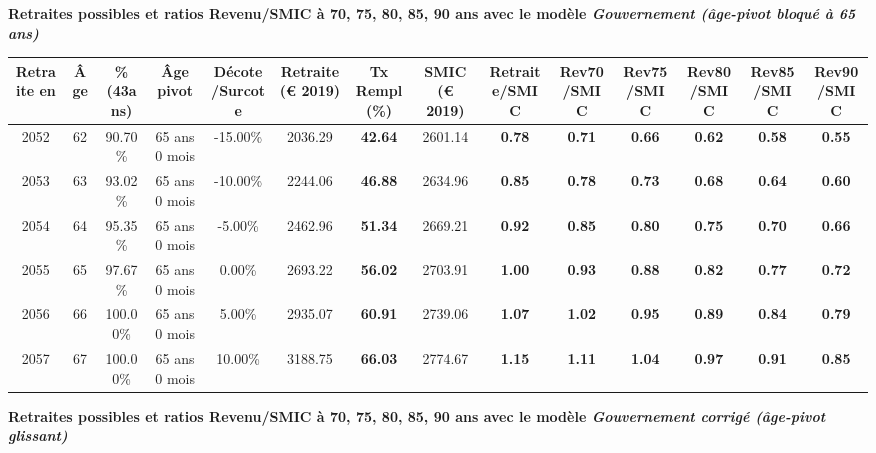 {\bf \noindent Retraites possibles et ratios Revenu/SMIC à 70, 75, 80, 85, 90 ans avec le modèle \emph{Gouvernement (âge-pivot bloqué à 65 ans)}}  
 
\begin{adjustbox}{max width=\textwidth} 
\begin{tabular}[htb]{|c|c||c|c|c||c|c||c||c|c|c|c|c|c|} 
\hline 
 Retraite en &  Âge &  \%(43ans) &  Âge pivot &  Décote/Surcote &  Retraite (\euro{} 2019) &  Tx Rempl(\%) &  SMIC (\euro{} 2019) &  Retraite/SMIC &  Rev70/SMIC &  Rev75/SMIC &  Rev80/SMIC &  Rev85/SMIC &  Rev90/SMIC \\ 
\hline \hline 
 2052 &  62 &  90.70\% &  65 ans 0 mois &  -15.00\% &  2036.29 &  {\bf 42.64} &  2601.14 &  {\bf {\color{red} 0.78}} &  {\bf {\color{red} 0.71}} &  {\bf {\color{red} 0.66}} &  {\bf {\color{red} 0.62}} &  {\bf {\color{red} 0.58}} &  {\bf {\color{red} 0.55}} \\ 
\hline 
 2053 &  63 &  93.02\% &  65 ans 0 mois &  -10.00\% &  2244.06 &  {\bf 46.88} &  2634.96 &  {\bf {\color{red} 0.85}} &  {\bf {\color{red} 0.78}} &  {\bf {\color{red} 0.73}} &  {\bf {\color{red} 0.68}} &  {\bf {\color{red} 0.64}} &  {\bf {\color{red} 0.60}} \\ 
\hline 
 2054 &  64 &  95.35\% &  65 ans 0 mois &  -5.00\% &  2462.96 &  {\bf 51.34} &  2669.21 &  {\bf {\color{red} 0.92}} &  {\bf {\color{red} 0.85}} &  {\bf {\color{red} 0.80}} &  {\bf {\color{red} 0.75}} &  {\bf {\color{red} 0.70}} &  {\bf {\color{red} 0.66}} \\ 
\hline 
 2055 &  65 &  97.67\% &  65 ans 0 mois &  0.00\% &  2693.22 &  {\bf 56.02} &  2703.91 &  {\bf {\color{red} 1.00}} &  {\bf {\color{red} 0.93}} &  {\bf {\color{red} 0.88}} &  {\bf {\color{red} 0.82}} &  {\bf {\color{red} 0.77}} &  {\bf {\color{red} 0.72}} \\ 
\hline 
 2056 &  66 &  100.00\% &  65 ans 0 mois &  5.00\% &  2935.07 &  {\bf 60.91} &  2739.06 &  {\bf 1.07} &  {\bf 1.02} &  {\bf {\color{red} 0.95}} &  {\bf {\color{red} 0.89}} &  {\bf {\color{red} 0.84}} &  {\bf {\color{red} 0.79}} \\ 
\hline 
 2057 &  67 &  100.00\% &  65 ans 0 mois &  10.00\% &  3188.75 &  {\bf 66.03} &  2774.67 &  {\bf 1.15} &  {\bf 1.11} &  {\bf 1.04} &  {\bf {\color{red} 0.97}} &  {\bf {\color{red} 0.91}} &  {\bf {\color{red} 0.85}} \\ 
\hline 
\hline 
\end{tabular} 
\end{adjustbox} 
 
 \vspace{0.1cm} 
{\bf \noindent Retraites possibles et ratios Revenu/SMIC à 70, 75, 80, 85, 90 ans avec le modèle \emph{Gouvernement corrigé (âge-pivot glissant)}}  
 
